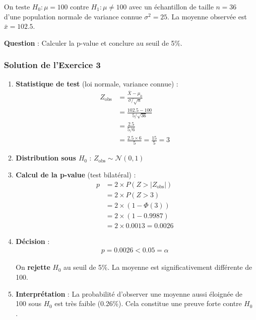 \documentclass[11pt,a4paper]{article}
\newcommand{\N}{\mathcal{N}}
\begin{document}
On teste $H_0 : \mu = 100$ contre $H_1 : \mu \neq 100$ avec un échantillon de taille $n = 36$ d'une population normale de variance connue $\sigma^2 = 25$. La moyenne observée est $\bar{x} = 102.5$.

\textbf{Question} : Calculer la p-value et conclure au seuil de 5\%.

\subsubsection*{Solution de l'Exercice 3}

\begin{enumerate}
    \item \textbf{Statistique de test} (loi normale, variance connue) :
    \begin{align*}
    Z_{\text{obs}} &= \frac{\bar{X} - \mu_0}{\sigma/\sqrt{n}} \\
    &= \frac{102.5 - 100}{5/\sqrt{36}} \\
    &= \frac{2.5}{5/6} \\
    &= \frac{2.5 \times 6}{5} = \frac{15}{5} = 3
    \end{align*}
    
    \item \textbf{Distribution sous $H_0$} : $Z_{\text{obs}} \sim \N(0,1)$
    
    \item \textbf{Calcul de la p-value} (test bilatéral) :
    \begin{align*}
    p &= 2 \times P(Z > |Z_{\text{obs}}|) \\
    &= 2 \times P(Z > 3) \\
    &= 2 \times (1 - \Phi(3)) \\
    &= 2 \times (1 - 0.9987) \\
    &= 2 \times 0.0013 = 0.0026
    \end{align*}
    
    \item \textbf{Décision} :
    \begin{align*}
    p = 0.0026 < 0.05 = \alpha
    \end{align*}
    
    On \textbf{rejette} $H_0$ au seuil de 5\%. La moyenne est significativement différente de 100.
    
    \item \textbf{Interprétation} : La probabilité d'observer une moyenne aussi éloignée de 100 sous $H_0$ est très faible (0.26\%). Cela constitue une preuve forte contre $H_0$.
\end{enumerate}
\end{document}
